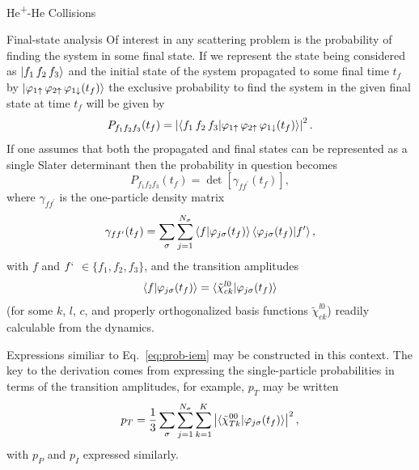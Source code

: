 \documentclass[letterpaper, 11 pt]{report}
\begin{document}
\begin{chapter}{\texorpdfstring{He\textsuperscript{+}}{He+}-He Collisions \label{chap:hephe}}
\begin{section}{Final-state analysis \label{sec:hephe-det}}
      Of interest in any scattering problem is the probability of finding the system in some final state.
      If we represent the state being considered as $\ket{f_1 \, f_2 \, f_3}$ and the initial state of
      the system propagated to some final time $t_f$ by $\ket{\varphi_{1 \uparrow} \,
      \varphi_{2 \uparrow} \, \varphi_{1 \downarrow} (t_f)}$ the exclusive probability to find the
      system in the given final state at time $t_f$ will be given by
      \begin{equation} \label{eq:finalProb}
         P_{f_1 f_2 f_3}(t_f) = \left| \braket{ f_1 \, f_2 \, f_3 | \varphi_{1 \uparrow} \,
                                       \varphi_{2 \uparrow} \, \varphi_{1 \downarrow} (t_f) } \right|^2.
      \end{equation}
      If one assumes that both the propagated and final states can be represented as a single Slater
      determinant then the probability in question becomes
      \begin{equation} \label{eq:detProb}
         P_{f_1 f_2 f_3}(t_f) = \det \left[ \gamma_{f f^\prime}(t_f) \right],
      \end{equation}
      where $\gamma_{f f^\prime}$ is the one-particle density matrix
      \begin{equation} \label{eq:denmat}
         \gamma_{f f^\prime}(t_f) = \sum\limits_{\sigma} \sum\limits_{j = 1}^{N_\sigma}
                               \braket{f | \varphi_{j \sigma}(t_f)}
                               \braket{\varphi_{j \sigma}(t_f) | f^\prime},
      \end{equation}
      with $f$ and $f`$ $\in \{f_1, f_2, f_3\}$, and the transition amplitudes
      \begin{equation}
         \braket{f | \varphi_{j \sigma}(t_f)}
         = \braket{\tilde{\chi}^{l0}_{c k} | \varphi_{j \sigma}(t_f)}
      \end{equation}
      (for some $k$, $l$, $c$, and properly orthogonalized basis functions $\tilde{\chi}^{l0}_{c k}$)
      readily calculable from the dynamics.

      Expressions similiar to Eq.~\eqref{eq:prob-iem} may be constructed in this
      context. The key to the derivation comes from expressing the single-particle probabilities in
      terms of the transition amplitudes, for example, $p_T$ may be written
      \begin{equation} \label{eq:ptTrans}
         p_T = \frac{1}{3} \sum\limits_{\sigma} \sum\limits_{j = 1}^{N_\sigma} \sum\limits_{k = 1}^{K}
               \left| \braket{ \tilde{\chi}^{00}_{T k} | \varphi_{j \sigma}(t_f)}\right|^2,
      \end{equation}
      with $p_P$ and $p_I$ expressed similarly.


\end{section}
\end{chapter}
\end{document}
